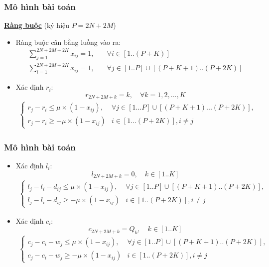 \documentclass{beamer}
\begin{document}
	\begin{frame}
		\frametitle{Mô hình bài toán}
		\textbf{\underline{Ràng buộc}} (ký hiệu $P=2N+2M$)
		\begin{itemize}
			\item Ràng buộc cân bằng luồng vào ra:
				\begin{align}
				\sum_{j=1}^{2N+2M+2K} x_{ij} = 1,\quad & \forall i\in [1..(P+K)] \\
				\sum_{i=1}^{2N+2M+2K} x_{ij} = 1,\quad & \forall j\in [1..P]\cup [(P+K+1)..(P+2K)]
				\end{align}
			\item Xác định $r_i$:
				\begin{equation}
					r_{2N+2M+k} = k,\quad \forall k=1,2,...,K
				\end{equation}
				\begin{align}
				\begin{cases}
				r_j - r_i\leq \mu\times (1 - x_{ij}), &\forall j\in [1...P]\cup [(P+K+1)...(P+2K)],\\ 
				r_j - r_i\geq -\mu\times (1 - x_{ij}) &i\in [1...(P+2K)], i\ne j
				\end{cases}
				\end{align}
		\end{itemize}
	\end{frame}

	\begin{frame}
		\frametitle{Mô hình bài toán}
		\begin{itemize}
			\item Xác định $l_i$:
				\begin{equation}
					l_{2N+2M+k} = 0,\quad k\in [1..K]
				\end{equation}
				\begin{align}
				\begin{cases}
				l_j - l_i -d_{ij}\leq \mu\times (1 - x_{ij}), & \forall j\in [1..P]\cup [(P+K+1)..(P+2K)], \\
				l_j - l_i -d_{ij}\geq -\mu\times (1 - x_{ij}) & i\in [1..(P+2K)], i\ne j
				\end{cases}
				\end{align}
			\item Xác định $c_i$:
				\begin{equation}
				c_{2N+2M+k} = Q_k,\quad k\in [1..K]
				\end{equation}
				\begin{align}
				\begin{cases}
				c_j - c_i - w_j\leq \mu\times (1 - x_{ij}), & \forall j\in [1..P]\cup [(P+K+1)..(P+2K)], \\
				c_j - c_i - w_j\geq -\mu\times (1 - x_{ij}) & i\in [1..(P+2K)], i\ne j
				\end{cases}
				\end{align}
		\end{itemize}
	\end{frame}
\end{document}
